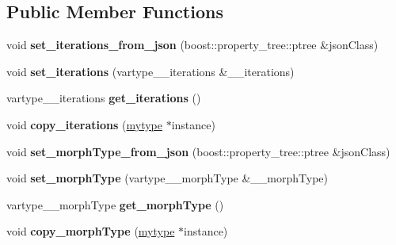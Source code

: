 \subsection*{Public Member Functions}
\begin{DoxyCompactItemize}
\item 
\mbox{\label{classfilter_1_1algos_1_1_erode_adfe5cb49788dbdbb0bf58813ba103e07}} 
void {\bfseries set\+\_\+iterations\+\_\+from\+\_\+json} (boost\+::property\+\_\+tree\+::ptree \&json\+Class)
\item 
\mbox{\label{classfilter_1_1algos_1_1_erode_a8af40724658d8f4b2f3be7e7226b5e27}} 
void {\bfseries set\+\_\+iterations} (vartype\+\_\+\+\_\+iterations \&\+\_\+\+\_\+iterations)
\item 
\mbox{\label{classfilter_1_1algos_1_1_erode_a29deab7218652d4e48e2fda4c7cb093e}} 
vartype\+\_\+\+\_\+iterations {\bfseries get\+\_\+iterations} ()
\item 
\mbox{\label{classfilter_1_1algos_1_1_erode_a92d4693fdb5ee9e1afbfa26fc5fe4b14}} 
void {\bfseries copy\+\_\+iterations} (\hyperlink{classfilter_1_1algos_1_1_erode}{mytype} $\ast$instance)
\item 
\mbox{\label{classfilter_1_1algos_1_1_erode_aa59744735acf12547a9b254beccfaadc}} 
void {\bfseries set\+\_\+morph\+Type\+\_\+from\+\_\+json} (boost\+::property\+\_\+tree\+::ptree \&json\+Class)
\item 
\mbox{\label{classfilter_1_1algos_1_1_erode_a5c76c50fa86a77514353d5e2e9a7ae35}} 
void {\bfseries set\+\_\+morph\+Type} (vartype\+\_\+\+\_\+morph\+Type \&\+\_\+\+\_\+morph\+Type)
\item 
\mbox{\label{classfilter_1_1algos_1_1_erode_a9403bf4be3b8271c319cb302de5a326e}} 
vartype\+\_\+\+\_\+morph\+Type {\bfseries get\+\_\+morph\+Type} ()
\item 
\mbox{\label{classfilter_1_1algos_1_1_erode_a085dafc4c60d30dd3ac81e69ad28e2b0}} 
void {\bfseries copy\+\_\+morph\+Type} (\hyperlink{classfilter_1_1algos_1_1_erode}{mytype} $\ast$instance)

\end{DoxyCompactItemize}
